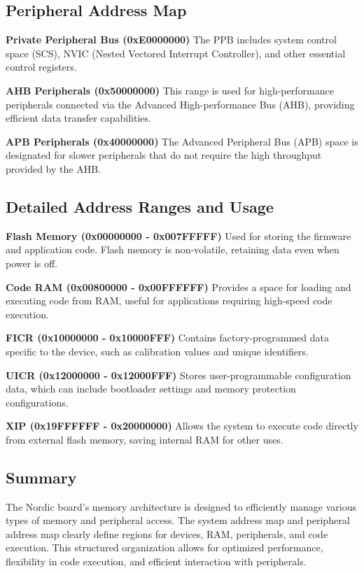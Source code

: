 \documentclass{Configuration_Files/PoliMi3i_thesis}
\begin{document}
\subsection{Peripheral Address Map}

\textbf{Private Peripheral Bus (0xE0000000)}
The PPB includes system control space (SCS), NVIC (Nested Vectored Interrupt Controller), and other essential control registers.

\textbf{AHB Peripherals (0x50000000)}
This range is used for high-performance peripherals connected via the Advanced High-performance Bus (AHB), providing efficient data transfer capabilities.

\textbf{APB Peripherals (0x40000000)}
The Advanced Peripheral Bus (APB) space is designated for slower peripherals that do not require the high throughput provided by the AHB.

\subsection{Detailed Address Ranges and Usage}

\textbf{Flash Memory (0x00000000 - 0x007FFFFF)}
Used for storing the firmware and application code. Flash memory is non-volatile, retaining data even when power is off.

\textbf{Code RAM (0x00800000 - 0x00FFFFFF)}
Provides a space for loading and executing code from RAM, useful for applications requiring high-speed code execution.

\textbf{FICR (0x10000000 - 0x10000FFF)}
Contains factory-programmed data specific to the device, such as calibration values and unique identifiers.

\textbf{UICR (0x12000000 - 0x12000FFF)}
Stores user-programmable configuration data, which can include bootloader settings and memory protection configurations.

\textbf{XIP (0x19FFFFFF - 0x20000000)}
Allows the system to execute code directly from external flash memory, saving internal RAM for other uses.

\subsection{Summary}
The Nordic board's memory architecture is designed to efficiently manage various types of memory and peripheral access. The system address map and peripheral address map clearly define regions for devices, RAM, peripherals, and code execution. This structured organization allows for optimized performance, flexibility in code execution, and efficient interaction with peripherals.
\end{document}
